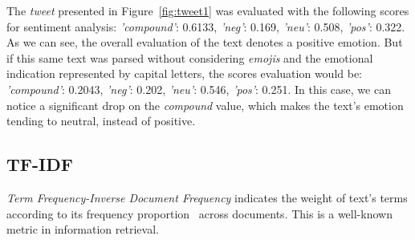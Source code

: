 The \textit{tweet} presented in Figure~\ref{fig:tweet1} was evaluated with the following scores for sentiment analysis: \textit{'compound'}: 0.6133, \textit{'neg'}: 0.169, \textit{'neu'}: 0.508, \textit{'pos'}: 0.322. As we can see, the overall evaluation of the text denotes a positive emotion. But if this same text was parsed without considering \textit{emojis} and the emotional indication represented by capital letters, 
the scores evaluation would be: \textit{'compound'}: 0.2043, \textit{'neg'}: 0.202, \textit{'neu'}: 0.546, \textit{'pos'}: 0.251. In this case, we can notice a significant drop on the \textit{compound} value, which makes the text's emotion tending to neutral, instead of positive.%



\subsection{TF-IDF\label{TFID}}

\textit{Term Frequency-Inverse Document Frequency} indicates the weight of text's terms according to its frequency proportion~\cite{Dipanjan:2016} across documents. This %
is a well-known metric in information retrieval. %


